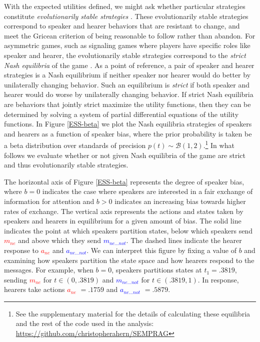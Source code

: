 \documentclass[linguex]{sp}
\theoremstyle{definition} \newtheorem{definition}{Definition}
\begin{document}
With the expected utilities defined, we might ask whether particular strategies constitute \emph{evolutionarily stable strategies} \citep{maynard-smith1982}. These evolutionarily stable strategies correspond to speaker and hearer behaviors that are resistant to change, and meet the Gricean criterion of being reasonable to follow rather than abandon. For asymmetric games, such as signaling games where players have specific roles like speaker and hearer, the evolutionarily stable strategies correspond to the \emph{strict Nash equilibria} of the game \citep{selten:1980}.  As a point of reference, a pair of speaker and hearer strategies is a Nash equilibrium if neither speaker nor hearer would do better by unilaterally changing behavior. Such an equilibrium is \emph{strict} if both speaker and hearer would do worse by unilaterally changing behavior.  If strict Nash equilibria are behaviors that jointly strict maximize the utility functions, then they can be determined by solving a system of partial differential equations of the utility functions. In Figure \ref{ESS-beta} we plot the Nash equilibria strategies of speakers and hearers as a function of speaker bias, where the prior probability is taken be a beta distribution over standards of precision $p(t) \sim \mathcal{B}(1,2)$.\footnote{See the supplementary material for the details of calculating these equilibria and the rest of the code used in the analysis: \url{https://github.com/christopherahern/SEMPRAG}} In what follows we evaluate whether or not given Nash equilibria of the game are strict and thus evolutionarily stable strategies.

The horizontal axis of Figure \ref{ESS-beta} represents the degree of speaker bias, where $b=0$ indicates the case where speakers are interested in a fair exchange of information for attention and $b > 0$ indicates an increasing bias towards higher rates of exchange. The vertical axis represents the actions and states taken by speakers and hearers in equilibrium for a given amount of bias. The solid line indicates the point at which speakers partition states, below which speakers send \emph{\textcolor{red}{$m_{ne}$}} and above which they send \emph{\textcolor{blue}{$m_{ne...not}$}}. The dashed lines indicate the hearer response to  \emph{\textcolor{red}{$a_{ne}$}} and \emph{\textcolor{blue}{$a_{ne...not}$}}. We can interpret this figure by fixing a value of $b$ and examining how speakers partition the state space and how hearers respond to the messages. For example, when $b=0$, speakers partitions states at $t_1 = .3819$, sending \emph{\textcolor{red}{$m_{ne}$}} for $t \in (0, .3819)$ and \emph{\textcolor{blue}{$m_{ne...not}$}} for $t \in (.3819, 1)$. In response, hearers take actions \emph{\textcolor{red}{$a_{ne}$}} $=.1759$ and \emph{\textcolor{blue}{$a_{ne...not}$}} $ =.5879$. 
\end{document}
